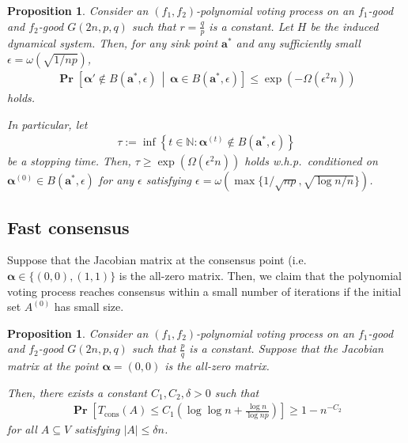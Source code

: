 \documentclass[letterpaper,11pt]{article}
\newtheorem{proposition}[theorem]{Proposition}
\newcommand{\Tcons}{T_{\mathrm{cons}}}
\renewcommand\Pr{\mathop{\mathbf{Pr}}}
\begin{document}
\begin{proposition} \label{prop:sinkpoint}
Consider an $(f_1,f_2)$-polynomial voting process on an $f_1$-good and $f_2$-good $G(2n,p,q)$ such that $r=\frac{q}{p}$ is a constant.
Let $H$ be the induced dynamical system.
Then, for any sink point $\mathbf{a}^*$ and any sufficiently small $\epsilon=\omega(\sqrt{1/np})$,
\begin{align*}
\Pr\left[{\boldsymbol \alpha}'\not\in B(\mathbf{a}^*,\epsilon)\,\middle|\,{\boldsymbol \alpha}\in B(\mathbf{a}^*,\epsilon)\right]\leq \exp(-\Omega(\epsilon^2 n))
\end{align*}
holds.

In particular, let 
\begin{align*}
\tau:=\inf\left\{t\in\mathbb{N}:{\boldsymbol \alpha}^{(t)}\not\in B(\mathbf{a}^*,\epsilon)\right\}
\end{align*}
be a stopping time.
Then, $\tau\geq\exp(\Omega(\epsilon^2 n))$ holds w.h.p.~conditioned on ${\boldsymbol \alpha}^{(0)}\in B(\mathbf{a}^*,\epsilon)$ for any $\epsilon$ satisfying $\epsilon=\omega(\max\{1/\sqrt{np},\sqrt{\log n/n}\})$.
\end{proposition}


\subsection{Fast consensus}
Suppose that the Jacobian matrix at the consensus point (i.e.~$\mathbf{\alpha}\in\{(0,0),(1,1)\}$ is the all-zero matrix.
Then, we claim that the polynomial voting process reaches consensus within a small number of iterations if the initial set $A^{(0)}$ has small size.

\begin{proposition} \label{prop:fastconsensus_Jacob}
Consider an $(f_1,f_2)$-polynomial voting process on an $f_1$-good and $f_2$-good $G(2n,p,q)$ such that $\frac{p}{q}$ is a constant.
Suppose that the Jacobian matrix at the point ${\boldsymbol \alpha}=(0,0)$ is the all-zero matrix.

Then, there exists a constant $C_1,C_2,\delta>0$ such that
\begin{align*}
\Pr\left[\Tcons(A)\leq C_1\left(\log\log n+\frac{\log n}{\log np}\right)\right]\geq 1-n^{-C_2}
\end{align*}
for all $A\subseteq V$ satisfying $|A|\leq \delta n$.
\end{proposition}
\end{document}
